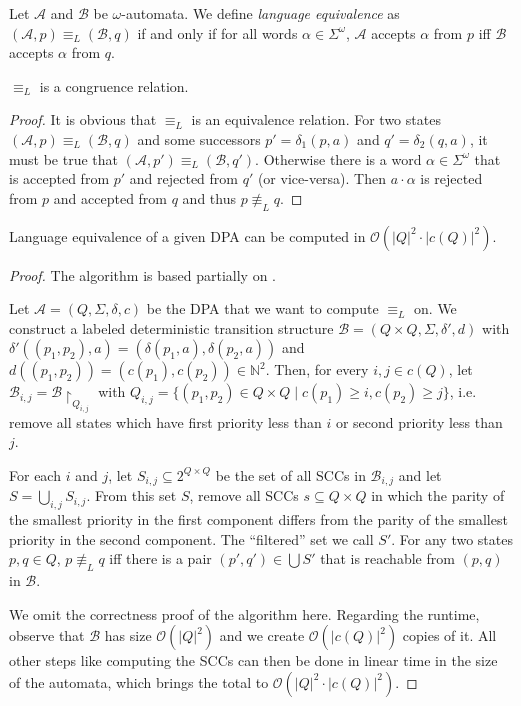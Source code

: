 \begin{defn}
	Let $\mathcal{A}$ and $\mathcal{B}$ be $\omega$-automata. We define \emph{language equivalence} as $(\mathcal{A}, p) \equiv_L (\mathcal{B}, q)$ if and only if for all words $\alpha \in \Sigma^\omega$, $\mathcal{A}$ accepts $\alpha$ from $p$ iff $\mathcal{B}$ accepts $\alpha$ from $q$.
\end{defn}

\begin{lem}
	$\equiv_L$ is a congruence relation.
	\label{lem:general:L_congruence}
\end{lem}

\begin{proof}
	It is obvious that $\equiv_L$ is an equivalence relation. For two states $(\mathcal{A}, p) \equiv_L (\mathcal{B}, q)$ and some successors $p' = \delta_1(p, a)$ and $q' = \delta_2(q, a)$, it must be true that $(\mathcal{A}, p') \equiv_L (\mathcal{B}, q')$. Otherwise there is a word $\alpha \in \Sigma^\omega$ that is accepted from $p'$ and rejected from $q'$ (or vice-versa). Then $a \cdot \alpha$ is rejected from $p$ and accepted from $q$ and thus $p \not\equiv_L q$.
\end{proof}

\begin{lem}
	Language equivalence of a given DPA can be computed in $\mathcal{O}(|Q|^2 \cdot |c(Q)|^2)$.
\end{lem}

\begin{proof}
	The algorithm is based partially on \cite{HenzingerTelle1996}.
	
	Let $\mathcal{A} = (Q, \Sigma, \delta, c)$ be the DPA that we want to compute $\equiv_L$ on. We construct a labeled deterministic transition structure $\mathcal{B} = (Q \times Q, \Sigma, \delta', d)$ with $\delta'((p_1, p_2), a) = (\delta(p_1, a), \delta(p_2, a))$ and $d((p_1, p_2)) = (c(p_1), c(p_2)) \in \mathbb{N}^2$. Then, for every $i, j \in c(Q)$, let $\mathcal{B}_{i,j} = \mathcal{B} \upharpoonright_{Q_{i,j}}$ with $Q_{i,j} = \{ (p_1, p_2) \in Q \times Q \mid c(p_1) \geq i, c(p_2) \geq j \}$, i.e. remove all states which have first priority less than $i$ or second priority less than $j$.
	
	For each $i$ and $j$, let $S_{i,j} \subseteq 2^{Q \times Q}$ be the set of all SCCs in $\mathcal{B}_{i,j}$ and let $S = \bigcup_{i,j} S_{i,j}$. From this set $S$, remove all SCCs $s \subseteq Q \times Q$ in which the parity of the smallest priority in the first component differs from the parity of the smallest priority in the second component. The \enquote{filtered} set we call $S'$. For any two states $p, q \in Q$, $p \not\equiv_L q$ iff there is a pair $(p', q') \in \bigcup S'$ that is reachable from $(p, q)$ in $\mathcal{B}$.
	
	We omit the correctness proof of the algorithm here. Regarding the runtime, observe that $\mathcal{B}$ has size $\mathcal{O}(|Q|^2)$ and we create $\mathcal{O}(|c(Q)|^2)$ copies of it. All other steps like computing the SCCs can then be done in linear time in the size of the automata, which brings the total to $\mathcal{O}(|Q|^2 \cdot |c(Q)|^2)$.
\end{proof}


